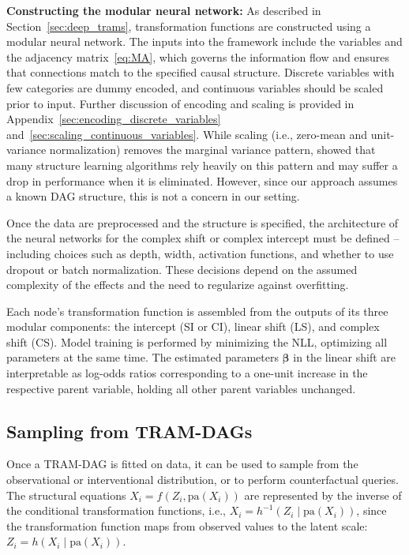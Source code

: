 \textbf{Constructing the modular neural network:} As described in Section~\ref{sec:deep_trams}, transformation functions are constructed using a modular neural network. The inputs into the framework include the variables and the adjacency matrix~\ref{eq:MA}, which governs the information flow and ensures that connections match to the specified causal structure. Discrete variables with few categories are dummy encoded, and continuous variables should be scaled prior to input. Further discussion of encoding and scaling is provided in Appendix~\ref{sec:encoding_discrete_variables} and~\ref{sec:scaling_continuous_variables}.
While scaling (i.e., zero-mean and unit-variance normalization) removes the marginal variance pattern, \citet{reisach2021} showed that many structure learning algorithms rely heavily on this pattern and may suffer a drop in performance when it is eliminated. However, since our approach assumes a known DAG structure, this is not a concern in our setting.

Once the data are preprocessed and the structure is specified, the architecture of the neural networks for the complex shift or complex intercept must be defined -- including choices such as depth, width, activation functions, and whether to use dropout or batch normalization. These decisions depend on the assumed complexity of the effects and the need to regularize against overfitting.

Each node's transformation function is assembled from the outputs of its three modular components: the intercept (SI or CI), linear shift (LS), and complex shift (CS). Model training is performed by minimizing the NLL, optimizing all parameters at the same time. The estimated parameters $\boldsymbol{\beta}$ in the linear shift are interpretable as log-odds ratios corresponding to a one-unit increase in the respective parent variable, holding all other parent variables unchanged.




\subsection{Sampling from TRAM-DAGs} \label{methods:sampling}

Once a TRAM-DAG is fitted on data, it can be used to sample from the observational or interventional distribution, or to perform counterfactual queries. The structural equations $X_i = f(Z_i, \text{pa}(X_i))$ are represented by the inverse of the conditional transformation functions, i.e., $X_i = h^{-1}(Z_i \mid \text{pa}(X_i))$, since the transformation function maps from observed values to the latent scale: $Z_i = h(X_i \mid \text{pa}(X_i))$.



